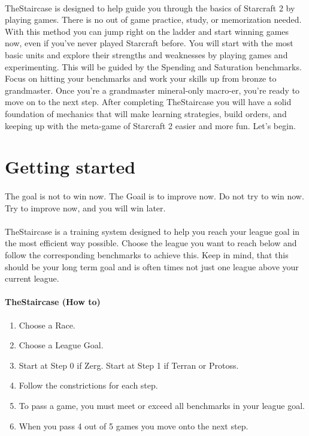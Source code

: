 \documentclass{article}
\begin{document}
\paragraph{}
TheStaircase is designed to help guide you through the basics of Starcraft 2 by
playing games. There is no out of game practice, study, or memorization needed.
With this method you can jump right on the ladder and start winning games now,
even if you’ve never played Starcraft before. You will start with the most basic
units and explore their strengths and weaknesses by playing games and
experimenting. This will be guided by the Spending and Saturation benchmarks.
Focus on hitting your benchmarks and work your skills up from bronze to
grandmaster. Once you’re a grandmaster mineral-only macro-er, you’re ready to
move on to the next step. After completing TheStaircase you will have a solid
foundation of mechanics that will make learning strategies, build orders, and
keeping up with the meta-game of Starcraft 2 easier and more fun. Let’s begin.


\section{Getting started}
\paragraph{}
The goal is not to win now. The Goail is to improve now. Do not try to win now.
Try to improve now, and you will win later.

\paragraph{}
TheStaircase is a training system designed to help you reach your league goal 
in the most efficient way possible.  Choose the league you want to reach below 
and follow the corresponding benchmarks to achieve this.  Keep in mind, that 
this should be your long term goal and is often times not just one league 
above your current league.

\paragraph{TheStaircase (How to)}
\begin{enumerate}
    \item Choose a Race.
    \item Choose a League Goal.
    \item Start at Step 0 if Zerg. Start at Step 1 if Terran or Protoss.
    \item Follow the constrictions for each step.
    \item To pass a game, you must meet or exceed all benchmarks in your league
        goal.
    \item When you pass 4 out of 5 games you move onto the next step.
\end{enumerate}
\end{document}
